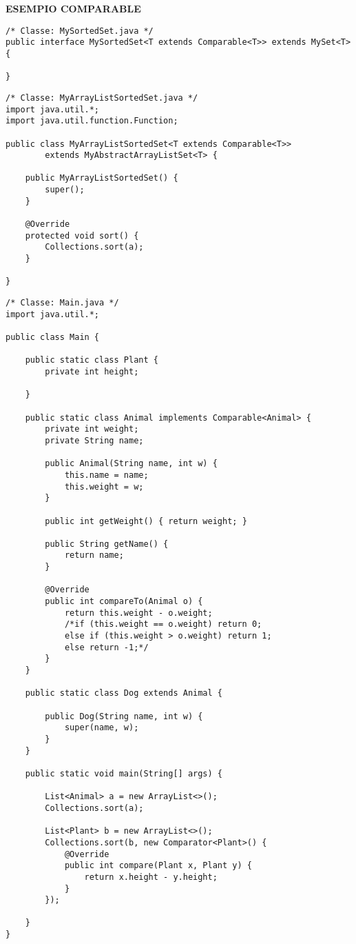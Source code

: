 \noindent \textbf{ESEMPIO COMPARABLE}
\begin{lstlisting}[basicstyle=\small,]
/* Classe: MySortedSet.java */
public interface MySortedSet<T extends Comparable<T>> extends MySet<T> {

}
\end{lstlisting}

\begin{lstlisting}[basicstyle=\small,]
/* Classe: MyArrayListSortedSet.java */
import java.util.*;
import java.util.function.Function;

public class MyArrayListSortedSet<T extends Comparable<T>>
        extends MyAbstractArrayListSet<T> {

    public MyArrayListSortedSet() {
        super();
    }

    @Override
    protected void sort() {
        Collections.sort(a);
    }

}
\end{lstlisting}

\begin{lstlisting}[basicstyle=\small,]
/* Classe: Main.java */
import java.util.*;

public class Main {

    public static class Plant {
        private int height;

    }

    public static class Animal implements Comparable<Animal> {
        private int weight;
        private String name;

        public Animal(String name, int w) {
            this.name = name;
            this.weight = w;
        }

        public int getWeight() { return weight; }

        public String getName() {
            return name;
        }

        @Override
        public int compareTo(Animal o) {
            return this.weight - o.weight;
            /*if (this.weight == o.weight) return 0;
            else if (this.weight > o.weight) return 1;
            else return -1;*/
        }
    }

    public static class Dog extends Animal {

        public Dog(String name, int w) {
            super(name, w);
        }
    }

    public static void main(String[] args) {

        List<Animal> a = new ArrayList<>();
        Collections.sort(a);

        List<Plant> b = new ArrayList<>();
        Collections.sort(b, new Comparator<Plant>() {
            @Override
            public int compare(Plant x, Plant y) {
                return x.height - y.height;
            }
        });

    }
}
\end{lstlisting}